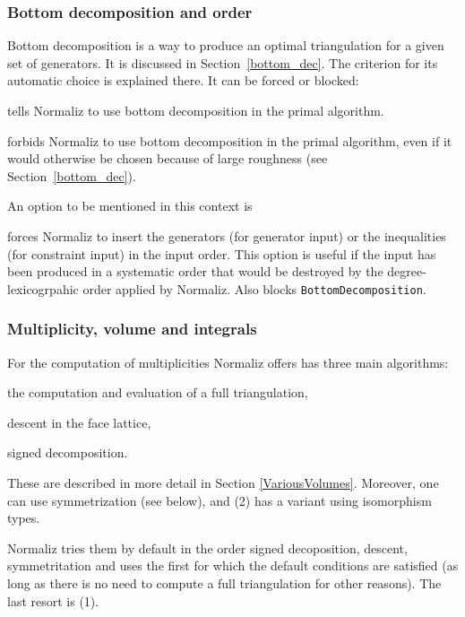 \subsubsection{Bottom decomposition and order}

Bottom decomposition is a way to produce an optimal triangulation for a given set of generators. It is discussed in Section~\ref{bottom_dec}. The criterion for its automatic choice is explained there. It can be forced or blocked:
\begin{itemize}
	\itemtt[BottomDecomposition, -b] tells Normaliz to use bottom decomposition in the primal algorithm.
	
	\itemtt[NoBottomDec, -o] forbids Normaliz to use bottom decomposition in the primal algorithm, even if it would otherwise be chosen because of large roughness (see Section~\ref{bottom_dec}).
\end{itemize}

An option to be mentioned in this context is
\begin{itemize}
	\itemtt[KeepOrder, -k]  forces Normaliz to insert the generators (for generator input) or the inequalities (for constraint input) in the input order. This option is useful if the input has been produced in a systematic order that would be destroyed by the degree-lexicogrpahic order applied by Normaliz. Also blocks \verb|BottomDecomposition|.
\end{itemize}


\subsubsection{Multiplicity, volume and integrals}
For the computation of multiplicities Normaliz offers has three main algorithms:
\begin{arab}
	\item the computation and evaluation of a full triangulation,
	\item descent in the face lattice,
	\item signed decomposition.
\end{arab}
These are described in more detail in Section \ref{VariousVolumes}. Moreover, one can use  symmetrization (see below), and (2) has a variant using isomorphism types.

Normaliz tries them by default in the order signed decoposition, descent, symmetritation and uses the first for which the default conditions are satisfied (as long as there is no need to compute a full triangulation for other reasons). The last resort is (1).

